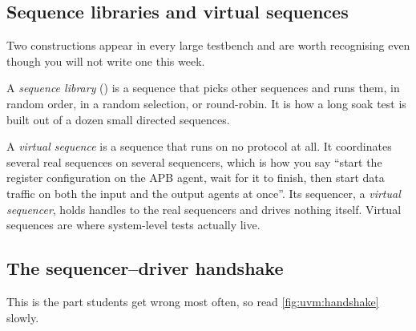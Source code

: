\subsection{Sequence libraries and virtual sequences}

%
Two constructions appear in every large testbench and are worth recognising
even though you will not write one this week.

A \emph{sequence library} () is a
sequence that picks other sequences and runs them, in random order, in a
random selection, or round-robin. It is how a long soak test is built out of
a dozen small directed sequences.

A \emph{virtual sequence} is a sequence that runs on no protocol at all. It
coordinates several real sequences on several sequencers, which is how you
say ``start the register configuration on the APB agent, wait for it to
finish, then start data traffic on both the input and the output agents at
once''. Its sequencer, a \emph{virtual sequencer}, holds handles to the real
sequencers and drives nothing itself. Virtual sequences are where
system-level tests actually live.

\subsection{The sequencer--driver handshake}
\label{sec:uvm:handshake}

%
This is the part students get wrong most often, so read
\cref{fig:uvm:handshake} slowly.

